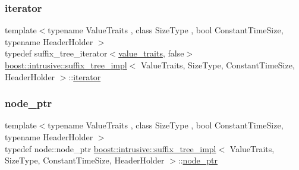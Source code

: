 \mbox{\label{classboost_1_1intrusive_1_1suffix__tree__impl_a2df3b52dced59346b59db470e93ba87c}} 
\subsubsection{\texorpdfstring{iterator}{iterator}}
{\footnotesize\ttfamily template$<$typename Value\+Traits , class Size\+Type , bool Constant\+Time\+Size, typename Header\+Holder $>$ \\
typedef suffix\+\_\+tree\+\_\+iterator$<$\hyperlink{classboost_1_1intrusive_1_1suffix__tree__impl_a30d9e164c38c11cd38917ad14e9f3e88}{value\+\_\+traits}, false$>$ \hyperlink{classboost_1_1intrusive_1_1suffix__tree__impl}{boost\+::intrusive\+::suffix\+\_\+tree\+\_\+impl}$<$ Value\+Traits, Size\+Type, Constant\+Time\+Size, Header\+Holder $>$\+::\hyperlink{classboost_1_1intrusive_1_1suffix__tree__impl_a2df3b52dced59346b59db470e93ba87c}{iterator}}

\mbox{\label{classboost_1_1intrusive_1_1suffix__tree__impl_a055e19a35a8268047cec3a6e9341dfca}} 
\subsubsection{\texorpdfstring{node\+\_\+ptr}{node\_ptr}}
{\footnotesize\ttfamily template$<$typename Value\+Traits , class Size\+Type , bool Constant\+Time\+Size, typename Header\+Holder $>$ \\
typedef node\+::node\+\_\+ptr \hyperlink{classboost_1_1intrusive_1_1suffix__tree__impl}{boost\+::intrusive\+::suffix\+\_\+tree\+\_\+impl}$<$ Value\+Traits, Size\+Type, Constant\+Time\+Size, Header\+Holder $>$\+::\hyperlink{classboost_1_1intrusive_1_1suffix__tree__impl_a055e19a35a8268047cec3a6e9341dfca}{node\+\_\+ptr}}

\mbox{\label{classboost_1_1intrusive_1_1suffix__tree__impl_a4fac695b2c8ea16789711a9840af44c4}} 
